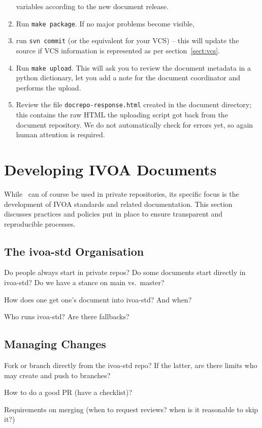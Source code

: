 \documentclass[11pt,a4paper]{ivoa}
\begin{document}
\begin{enumerate}
variables according to the new document release.
\item Run \verb|make package|.  If no major problems become visible,
\item run \verb|svn commit| (or the equivalent for your VCS) -- this
will update the source if VCS information is represented as per
section~\ref{sect:vcs}.
\item Run \verb|make upload|.  This will ask you to review the document
metadata in a python dictionary, let you add a note for the document
coordinator and performs the upload.
\item Review the file \texttt{docrepo-response.html} created in the
document directory; this contains the raw HTML the uploading script got
back from the document repository.  We do not automatically check for
errors yet, so again human attention is required.
\end{enumerate}


\section{Developing IVOA Documents}
\label{sect:ivoapol}

While \ivoatex\ can of course be used in private repositories, its
specific focus is the development of IVOA standards and related
documentation.  This section discusses practices and policies put in
place to ensure transparent and reproducible processes.

\subsection{The ivoa-std Organisation}

Do people always start in private repos?  Do some documents start
directly in ivoa-std?  Do we have a stance on main vs.~master?

How does one get one's document into ivoa-std?  And when?

Who runs ivoa-std?  Are there fallbacks?

\subsection{Managing Changes}

Fork or branch directly from the ivoa-std repo?  If the latter, are
there limits who may create and push to branches?

How to do a good PR (have a checklist)?

Requirements on merging (when to request reviews?  when is it reasonable
to skip it?)
\end{document}
